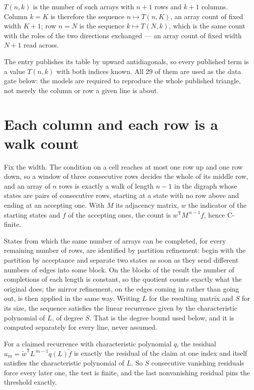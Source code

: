 \documentclass[11pt]{article}
\theoremstyle{definition}
\begin{document}
$T(n,k)$ is the number of such arrays with $n + 1$ rows and $k + 1$ columns. Column $k = K$ is therefore the sequence $n \mapsto T(n,K)$, an array count of fixed width $K + 1$; row $n = N$ is the sequence $k \mapsto T(N,k)$, which is the same count with the roles of the two directions exchanged --- an array count of fixed width $N + 1$ read across.

The entry publishes its table by upward antidiagonals, so every published term is a value $T(n,k)$ with both indices known. All 29 of them are used as the data gate below: the models are required to reproduce the whole published triangle, not merely the column or row a given line is about.

\section{Each column and each row is a walk count}

Fix the width. The condition on a cell reaches at most one row up and one row down, so a window of three consecutive rows decides the whole of its middle row, and an array of $n$ rows is exactly a walk of length $n-1$ in the digraph whose states are pairs of consecutive rows, starting at a state with no row above and ending at an accepting one. With $M$ its adjacency matrix, $w$ the indicator of the starting states and $f$ of the accepting ones, the count is $w^{\mathsf T}M^{\,n-1}f$, hence C-finite.

States from which the same number of arrays can be completed, for every remaining number of rows, are identified by partition refinement: begin with the partition by acceptance and separate two states as soon as they send different numbers of edges into some block. On the blocks of the result the number of completions of each length is constant, so the quotient counts exactly what the original does; the mirror refinement, on the edges coming in rather than going out, is then applied in the same way. Writing $L$ for the resulting matrix and $S$ for its size, the sequence satisfies the linear recurrence given by the characteristic polynomial of $L$, of degree $S$. That is the degree bound used below, and it is computed separately for every line, never assumed.

For a claimed recurrence with characteristic polynomial $q$, the residual $u_m = \tilde w^{\mathsf T}L^{\,m-1}q(L)\tilde f$ is exactly the residual of the claim at one index and itself satisfies the characteristic polynomial of $L$. So $S$ consecutive vanishing residuals force every later one, the test is finite, and the last nonvanishing residual pins the threshold exactly.
\end{document}
